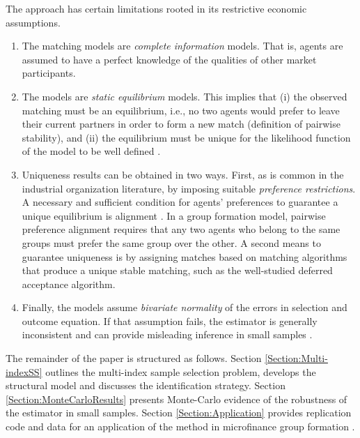 \begin{itemize}
The approach has certain limitations rooted in its restrictive economic assumptions. 
\begin{enumerate}
\item The matching models are \textit{complete information} models. That is, agents are assumed to have a perfect knowledge of the qualities of other market participants.
\item The models are \textit{static equilibrium} models. This implies that (i) the observed matching must be an equilibrium, i.e., no two agents would prefer to leave their current partners in order to form a new match (definition of pairwise stability), and (ii) the equilibrium must be unique for the likelihood function of the model to be well defined \citep{Bresnahan1991}.
\item Uniqueness results can be obtained in two ways. First, as is common in the industrial organization literature, by imposing suitable \textit{preference restrictions}. A necessary and sufficient condition for agents' preferences to guarantee a unique equilibrium is alignment \citep{Pycia2010}. In a group formation model, pairwise preference alignment requires that any two agents who belong to the same groups must prefer the same group over the other. A second means to guarantee uniqueness is by assigning matches based on matching algorithms that produce a unique stable matching, such as the well-studied \citet{Gale1962} deferred acceptance algorithm.
\item Finally, the models assume \textit{bivariate normality} of the errors in selection and outcome equation. If that assumption fails, the estimator is generally inconsistent and can provide misleading inference in small samples \citep{Goldberger1983}.
\end{enumerate}
\end{itemize}

\noindent The remainder of the paper is structured as follows. %
Section \ref{Section:Multi-indexSS} outlines the multi-index sample selection problem, develops the structural model and discusses the identification strategy. Section \ref{Section:MonteCarloResults} presents Monte-Carlo evidence of the robustness of the estimator in small samples. Section \ref{Section:Application} provides replication code and data for an application of the method in microfinance group formation \citep[see][]{Klein2015a}. %





